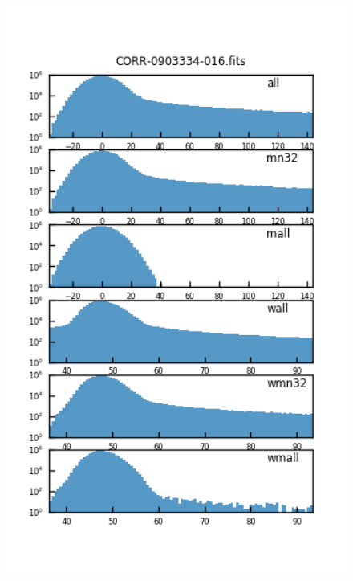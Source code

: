 \begin{figure}
\centering
  \begin{minipage}{.45\textwidth}
    \centering
    \includegraphics[width=1.0\textwidth]{figure/imgdist_CORR-0903334-016.fits.png}
  \end{minipage}
  \begin{minipage}{.45\textwidth}
    \centering

\end{minipage}
\end{figure}
